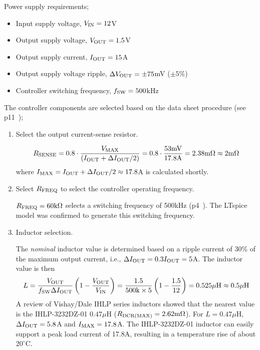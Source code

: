 Power supply requirements;
%
\begin{itemize}
\item Input supply voltage, $V_{\rm IN} = 12$V
\item Output supply voltage, $V_{\rm OUT} = 1.5$V
\item Output supply current, $I_{\rm OUT} = 15$A
\item Output supply voltage ripple, $\Delta V_{\rm OUT} = \pm 75$mV ($\pm5$\%)
\item Controller switching frequency, $f_{\rm SW} = 500$kHz
\end{itemize}
%
The controller components are selected based on the data
sheet procedure (see p11~\cite{Linear_LTC3851A_2010});
%
\begin{enumerate}
\item Select the output current-sense resistor.

\begin{equation}
R_{\rm SENSE} = 0.8\cdot\frac{V_{\rm MAX}}{(I_{\rm OUT} + \Delta I_{\rm OUT}/2)} =
0.8\cdot\frac{53\text{mV}}{17.8\text{A}} = 2.38\text{m}\Omega \approx  2\text{m}\Omega 
\end{equation}
%
where $I_{\rm MAX} = I_{\rm OUT} + \Delta I_{\rm OUT}/2 \approx 17.8$A is
calculated shortly.
%
\item Select $R_{\rm FREQ}$ to select the controller operating
frequency.

$R_{\rm FREQ} = 60\text{k}\Omega$ selects a switching frequency of
500kHz (p4~\cite{Linear_LTC3851A_2010}). The LTspice model was confirmed
to generate this switching frequency.

\item Inductor selection.

The {\em nominal} inductor value is determined based on a ripple current of
30\% of the maximum output current, i.e., 
$\Delta I_{\rm OUT} = 0.3I_{\rm OUT} = 5$A. The inductor value 
is then
%
\begin{equation}
L = \frac{V_{\rm OUT}}{f_{\rm SW}\Delta I_{\rm OUT}}\left(
1 - \frac{V_{\rm OUT}}{V_{\rm IN}}\right) =
\frac{1.5}{500\text{k}\times5}\left(
1 - \frac{1.5}{12}\right) = 0.525\mu\text{H} \approx 0.5\mu\text{H}
\end{equation}
%
A review of Vishay/Dale IHLP series inductors showed that the nearest
value is the IHLP-3232DZ-01 $0.47\mu\text{H}$ 
($R_{\rm DCR(MAX)} = 2.62\text{m}\Omega$).
For $L = 0.47\mu$H, $\Delta I_{\rm OUT} = 5.8$A and 
$I_{\rm MAX} = 17.8$A. The IHLP-3232DZ-01 inductor can easily
support a peak load current of 17.8A, resulting in a temperature 
rise of about $20^\circ$C.


\end{enumerate}
